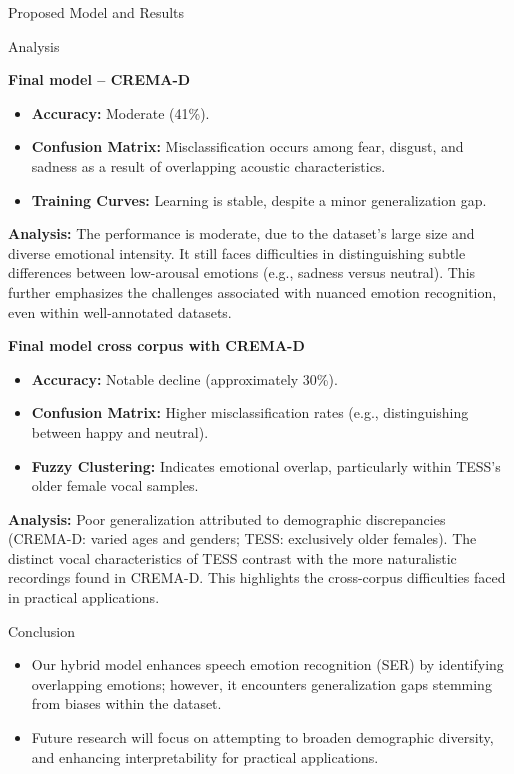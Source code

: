 \documentclass[final]{beamer}
\begin{document}
\begin{frame}[t]
\begin{minipage}[t]{0.42\textwidth}
\begin{block}{Proposed Model and Results}
  \end{block}

\end{minipage}
\begin{minipage}[t]{0.28\textwidth}
\begin{block}{Analysis}

\textbf{Final model -- CREMA-D}
\begin{itemize}    
    \item \textbf{Accuracy:} Moderate (41\%).
    \item \textbf{Confusion Matrix:} Misclassification occurs among fear, disgust, and sadness as a result of overlapping acoustic characteristics.
    \item \textbf{Training Curves:} Learning is stable, despite a minor generalization gap.
\end{itemize}
\textbf{Analysis:} The performance is moderate, due to the dataset's large size and diverse emotional intensity. It still faces difficulties in distinguishing subtle differences between low-arousal emotions (e.g., sadness versus neutral). This further emphasizes the challenges associated with nuanced emotion recognition, even within well-annotated datasets.

\textbf{Final model cross corpus with CREMA-D}
\begin{itemize}
    \item \textbf{Accuracy:} Notable decline (approximately 30\%).
    \item \textbf{Confusion Matrix:} Higher misclassification rates (e.g., distinguishing between happy and neutral).
    \item \textbf{Fuzzy Clustering:} Indicates emotional overlap, particularly within TESS’s older female vocal samples.
\end{itemize}
\textbf{Analysis:} Poor generalization attributed to demographic discrepancies (CREMA-D: varied ages and genders; TESS: exclusively older females). The distinct vocal characteristics of TESS contrast with the more naturalistic recordings found in CREMA-D. This highlights the cross-corpus difficulties faced in practical applications.

\end{block}

\begin{block}{Conclusion}
\begin{itemize}
\item Our hybrid model enhances speech emotion recognition (SER) by identifying overlapping emotions; however, it encounters generalization gaps stemming from biases within the dataset.
\item Future research will focus on attempting to broaden demographic diversity, and enhancing interpretability for practical applications.  
\end{itemize}


\end{block}
\end{minipage}
\end{frame}
\end{document}
